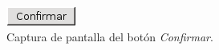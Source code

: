   \begin{figure}[!ht]
    \begin{center}
      \includegraphics[scale=0.6]{3.Caracteristicas_Interfaz/3.3.Gestion_Informacion/3.3.4.Eliminacion_Elementos/botonConfirmar.png}
      \caption{Captura de pantalla del botón \textit{Confirmar}.}
      \label{capturaBotonConfirmar}
    \end{center}
  \end{figure}
